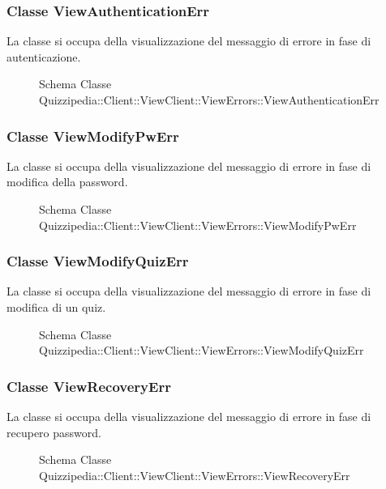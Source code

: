 \subsubsection{Classe ViewAuthenticationErr}
La classe si occupa della visualizzazione del messaggio di errore in fase di autenticazione.
\begin{figure}[H]
\centering
\noindent{}
\caption[Schema Classe ViewAuthenticationErr]{Schema Classe Quizzipedia::Client::ViewClient::ViewErrors::ViewAuthenticationErr}
\end{figure}
\subsubsection{Classe ViewModifyPwErr}
La classe si occupa della visualizzazione del messaggio di errore in fase di modifica della password.
\begin{figure}[H]
\centering
\noindent{}
\caption[Schema Classe ViewModifyPwErr]{Schema Classe Quizzipedia::Client::ViewClient::ViewErrors::ViewModifyPwErr}
\end{figure}
\subsubsection{Classe ViewModifyQuizErr}
La classe si occupa della visualizzazione del messaggio di errore in fase di modifica di un quiz.
\begin{figure}[H]
\centering
\noindent{}
\caption[Schema Classe ViewModifyQuizErr]{Schema Classe Quizzipedia::Client::ViewClient::ViewErrors::ViewModifyQuizErr}
\end{figure}
\subsubsection{Classe ViewRecoveryErr}
La classe si occupa della visualizzazione del messaggio di errore in fase di recupero password.
\begin{figure}[H]
\centering
\noindent{}
\caption[Schema Classe ViewRecoveryErr]{Schema Classe Quizzipedia::Client::ViewClient::ViewErrors::ViewRecoveryErr}
\end{figure}
